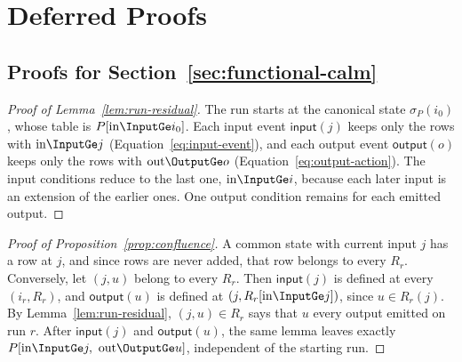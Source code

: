 \section{Deferred Proofs}
\label{app:proofs}

\subsection{Proofs for Section~\ref{sec:functional-calm}}
\label{app:proofs-sec2}

\begin{proof}[Proof of Lemma~\ref{lem:run-residual}]
The run starts at the canonical state $\sigma_P(i_0)$, whose table is
$P[\mathrm{in}\InputGe i_0]$. Each input event $\mathsf{input}(j)$ keeps only
the rows with $\mathrm{in}\InputGe j$ (Equation~\ref{eq:input-event}), and each
output event $\mathsf{output}(o)$ keeps only the rows with
$\mathrm{out}\OutputGe o$ (Equation~\ref{eq:output-action}). The input
conditions reduce to the last one, $\mathrm{in}\InputGe i$, because each later
input is an extension of the earlier ones. One output condition remains for each
emitted output.
\end{proof}

\begin{proof}[Proof of Proposition~\ref{prop:confluence}]
A common state with current input $j$ has a row at $j$, and since rows are
never added, that row belongs to every $R_r$.  Conversely, let $(j,u)$ belong
to every $R_r$.  Then $\mathsf{input}(j)$ is defined at every $(i_r,R_r)$, and
$\mathsf{output}(u)$ is defined at $(j,R_r[\mathrm{in}\InputGe j])$, since
$u\in R_r(j)$.  By
Lemma~\ref{lem:run-residual}, $(j,u)\in R_r$ says that $u$ \outrel every output
emitted on run $r$.  After $\mathsf{input}(j)$ and $\mathsf{output}(u)$, the
same lemma leaves exactly
$P[\mathrm{in}\InputGe j,\ \mathrm{out}\OutputGe u]$, independent of the
starting run.
\end{proof}

